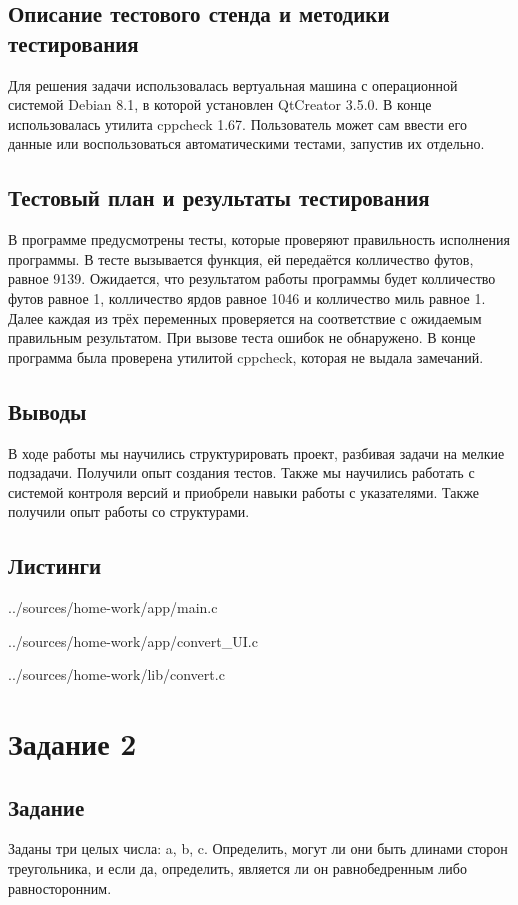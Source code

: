 \documentclass[12pt,a4paper]{report}
\begin{document}
\subsection{Описание тестового стенда и методики тестирования}
Для решения задачи использовалась вертуальная машина с операционной системой Debian 8.1, в которой установлен QtCreator 3.5.0. В конце использовалась утилита cppcheck 1.67.
Пользователь может сам ввести его данные или воспользоваться автоматическими тестами, запустив их отдельно.
\subsection{Тестовый план и результаты тестирования}
В программе предусмотрены тесты, которые проверяют правильность исполнения программы. В тесте вызывается функция, ей передаётся колличество футов, равное 9139. Ожидается, что результатом работы программы будет колличество футов равное 1, колличество ярдов равное 1046 и колличество миль равное 1. Далее каждая из трёх переменных проверяется на соответствие с ожидаемым правильным результатом. При вызове теста ошибок не обнаружено. В конце программа была проверена утилитой cppcheck, которая не выдала замечаний.
\subsection{Выводы}
В ходе работы мы научились структурировать проект, разбивая задачи на мелкие подзадачи. Получили опыт создания тестов. Также мы научились работать с системой контроля версий и приобрели навыки работы с указателями. Также получили опыт работы со структурами.
\subsection*{Листинги}

{../sources/home-work/app/main.c}


{../sources/home-work/app/convert_UI.c}


{../sources/home-work/lib/convert.c}


\section{Задание 2}
\subsection{Задание}
Заданы три целых числа: a, b, c. Определить, могут ли они быть длинами сторон треугольника, и если да, определить, является ли он равнобедренным либо равносторонним.
\end{document}
